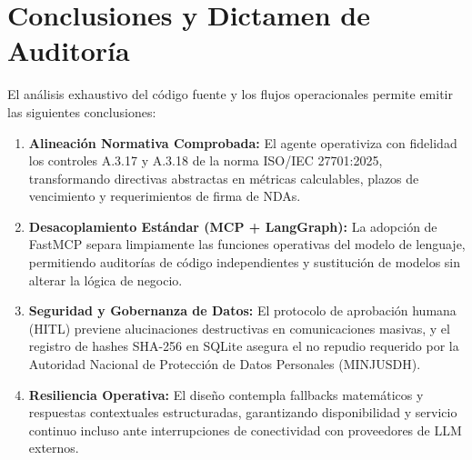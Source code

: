 \documentclass[11pt,a4paper]{article}
\begin{document}
\section{Conclusiones y Dictamen de Auditoría}

El análisis exhaustivo del código fuente y los flujos operacionales permite emitir las siguientes conclusiones:

\begin{enumerate}
    \item \textbf{Alineación Normativa Comprobada:} El agente operativiza con fidelidad los controles A.3.17 y A.3.18 de la norma ISO/IEC 27701:2025, transformando directivas abstractas en métricas calculables, plazos de vencimiento y requerimientos de firma de NDAs.
    \item \textbf{Desacoplamiento Estándar (MCP + LangGraph):} La adopción de FastMCP separa limpiamente las funciones operativas del modelo de lenguaje, permitiendo auditorías de código independientes y sustitución de modelos sin alterar la lógica de negocio.
    \item \textbf{Seguridad y Gobernanza de Datos:} El protocolo de aprobación humana (HITL) previene alucinaciones destructivas en comunicaciones masivas, y el registro de hashes SHA-256 en SQLite asegura el no repudio requerido por la Autoridad Nacional de Protección de Datos Personales (MINJUSDH).
    \item \textbf{Resiliencia Operativa:} El diseño contempla fallbacks matemáticos y respuestas contextuales estructuradas, garantizando disponibilidad y servicio continuo incluso ante interrupciones de conectividad con proveedores de LLM externos.
\end{enumerate}
\end{document}
